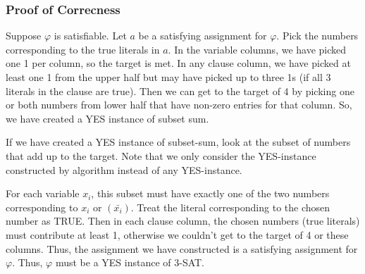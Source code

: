 \subsubsection{Proof of Correcness}
Suppose $\varphi$ is satisfiable. Let $a$ be a satisfying assignment for $\varphi$. Pick the numbers corresponding to the true literals in $a$. In the variable columns, we have picked one 1 per column, so the target is met. In any clause column, we have picked at least one 1 from the upper half but may have picked up to three 1s (if all 3 literals in the clause are true). Then we can get to the target of 4 by picking one or both numbers from lower half that have non-zero entries for that column. So, we have created a YES instance of subset sum.

If we have created a YES instance of subset-sum, look at the subset of numbers that add up to the target. Note that we only consider the YES-instance constructed by algorithm instead of any YES-instance.

For each variable $x_i$, this subset must have exactly one of the two numbers corresponding to $x_i$ or $(\bar{x_i})$. Treat the literal corresponding to the chosen number as TRUE. Then in each clause column, the chosen numbers (true literals) must contribute at least 1, otherwise we couldn't get to the target of 4 or these columns. Thus, the assignment we have constructed is a satisfying assignment for $\varphi$. Thus, $\varphi$ must be a YES instance of 3-SAT.
